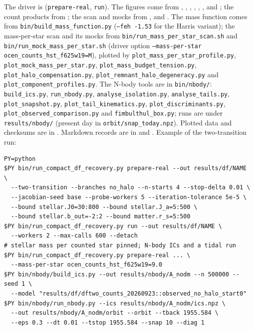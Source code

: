 \documentclass[11pt,a4paper]{article}
\begin{document}
The driver is  (\texttt{prepare-real},
\texttt{run}). The figures come from ,
, ,
, ,
,  and
; the count products from
; the scan and mocks from
,  and
. The mass function comes from
\texttt{bin/build\_mass\_function.py} (\texttt{--feh -1.53} for the Harris
variant); the mass-per-star scan and its mocks from
\texttt{bin/run\_mass\_per\_star\_scan.sh} and
\texttt{bin/run\_mock\_mass\_per\_star.sh} (driver option
\texttt{--mass-per-star ocen\_counts\_hst\_f625w19=M}), plotted by
\texttt{plot\_mass\_per\_star\_profile.py}, \texttt{plot\_mock\_mass\_per\_star.py},
\texttt{plot\_mass\_budget\_tension.py}, \texttt{plot\_halo\_compensation.py},
\texttt{plot\_remnant\_halo\_degeneracy.py} and
\texttt{plot\_component\_profiles.py}. The N-body tools are in
\texttt{bin/nbody/}: \texttt{build\_ics.py}, \texttt{run\_nbody.py},
\texttt{analyse\_isolation.py}, \texttt{analyse\_tails.py},
\texttt{plot\_snapshot.py}, \texttt{plot\_tail\_kinematics.py},
\texttt{plot\_discriminants.py}, \texttt{plot\_observed\_comparison.py} and
\texttt{fimbulthul\_box.py}; runs are under \texttt{results/nbody/} (present
day in \texttt{orbit/snap\_today.npz}). Plotted data and checksums are in
. Markdown records are in
 and
. Example of the two-transition
run:
\begin{verbatim}
PY=python
$PY bin/run_compact_df_recovery.py prepare-real --out results/df/NAME \
  --two-transition --branches no_halo --n-starts 4 --stop-delta 0.01 \
  --jacobian-seed base --probe-workers 5 --iteration-tolerance 5e-5 \
  --bound stellar.J0=30:800 --bound stellar.J_a=5:500 \
  --bound stellar.b_out=-2:2 --bound matter.r_s=5:500
$PY bin/run_compact_df_recovery.py run --out results/df/NAME \
  --workers 2 --max-calls 600 --detach
# stellar mass per counted star pinned; N-body ICs and a tidal run
$PY bin/run_compact_df_recovery.py prepare-real ... \
  --mass-per-star ocen_counts_hst_f625w19=9.0
$PY bin/nbody/build_ics.py --out results/nbody/A_nodm --n 500000 --seed 1 \
  --model "results/df/dftwo_counts_20260923::observed_no_halo_start0"
$PY bin/nbody/run_nbody.py --ics results/nbody/A_nodm/ics.npz \
  --out results/nbody/A_nodm/orbit --orbit --tback 1955.584 \
  --eps 0.3 --dt 0.01 --tstop 1955.584 --snap 10 --diag 1
\end{verbatim}



\end{document}
